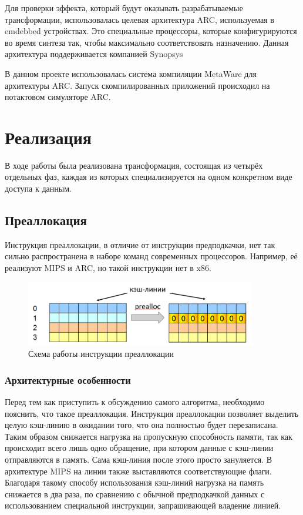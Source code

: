 \documentclass[12pt,a4paper,oneside]{article}
\begin{document}
\indent

Для проверки эффекта, который будут оказывать разрабатываемые трансформации, использовалась целевая архитектура ARC, используемая в emdebbed устройствах. Это специальные процессоры, которые конфигурируются во время синтеза так, чтобы максимально соответствовать назначению. Данная архитектура поддерживается компанией Synopsys\cite{Snps}

В данном проекте использовалась система компиляции MetaWare для архитектуры ARC. Запуск скомпилированных приложений происходил на потактовом симуляторе ARC.

\section{Реализация}

\indent

В ходе работы была реализована трансформация, состоящая из четырёх отдельных фаз, каждая из которых специализируется на одном конкретном виде доступа к данным.

\subsection{Преаллокация}

\indent

Инструкция преаллокации, в отличие от инструкции предподкачки, нет так сильно распространена в наборе команд современных процессоров. Например, её реализуют MIPS\cite{MIPS} и ARC, но такой инструкции нет в x86.

\begin{figure}
  \centering
  \includegraphics[width=0.9\textwidth]{prealloc.PNG}
  \caption{Схема работы инструкции преаллокации}
\end{figure}


\subsubsection{Архитектурные особенности}

\indent

Перед тем как приступить к обсуждению самого алгоритма, необходимо пояснить, что такое преаллокация. Инструкция преаллокации позволяет выделить целую кэш-линию в ожидании того, что она полностью будет перезаписана. Таким образом снижается нагрузка на пропускную способность памяти, так как происходит всего лишь одно обращение, при котором данные с кэш-линии отправляются в память. Сама кэш-линия после этого просто зануляется. В архитектуре MIPS на линии также выставляются соответствующие флаги. Благодаря такому способу использования кэш-линий нагрузка на память снижается в два раза, по сравнению с обычной предподкачкой данных с использованием специальной инструкции, запрашивающей владение линией.
\end{document}

